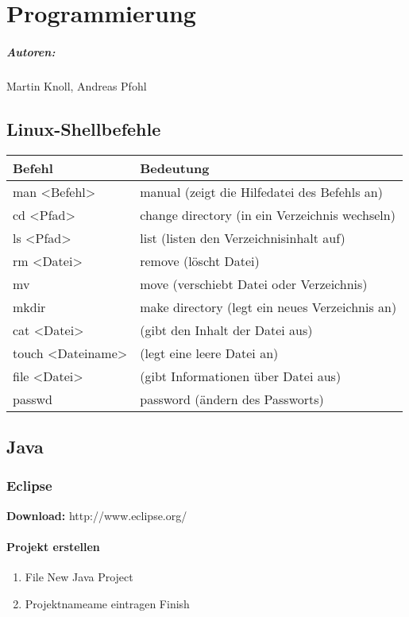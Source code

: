 
\chapter{Programmierung}\label{chap:prog}

\paragraph*{Autoren:} Martin Knoll, Andreas Pfohl

\section{Linux-Shellbefehle}
{
	\begin{tabular}{ll}
	\textbf{Befehl} & \textbf{Bedeutung}\\
	\hline
	man \textless{}Befehl\textgreater{} & manual (zeigt die Hilfedatei des Befehls an)\\
	cd \textless{}Pfad\textgreater{} & change directory (in ein Verzeichnis wechseln)\\
	ls \textless{}Pfad\textgreater{} & list (listen den Verzeichnisinhalt auf)\\
	rm \textless{}Datei\textgreater{} & remove (löscht Datei)\\
	mv & move (verschiebt Datei oder Verzeichnis)\\
	mkdir & make directory (legt ein neues Verzeichnis an)\\
	cat \textless{}Datei\textgreater{} & (gibt den Inhalt der Datei aus)\\
	touch \textless{}Dateiname\textgreater{} & (legt eine leere Datei an)\\
	file \textless{}Datei\textgreater{} & (gibt Informationen über Datei aus)\\
	passwd & password (ändern des Passworts)
	\end{tabular}
}

\section{Java}
	\lstset{language=Java}
	\subsection{Eclipse}
		\textbf{Download:} http://www.eclipse.org/
		\subsubsection{Projekt erstellen}
		\begin{enumerate}
		\item File \frqq New \frqq Java Project
		\item Projektnameame eintragen \frqq Finish
		\end{enumerate}
		
